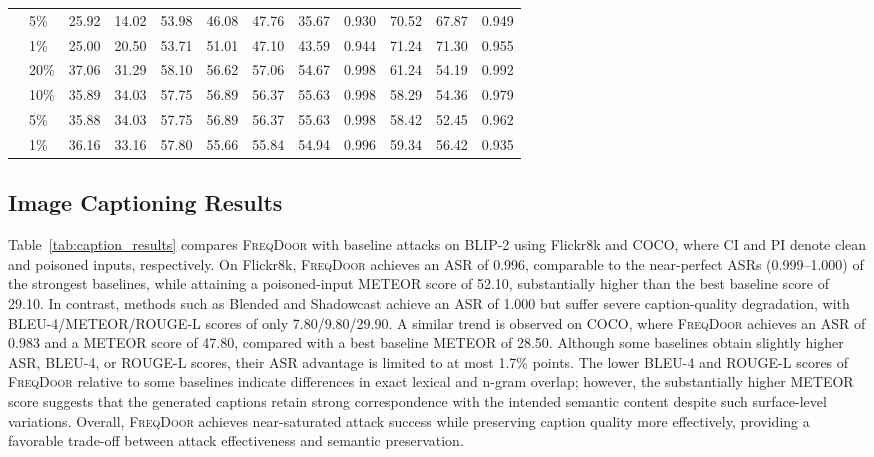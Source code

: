 \documentclass[lettersize,journal]{IEEEtran}
\begin{document}
\begin{table}[!p]
{\begin{tabular}{llcccccccccc}
 & 5\%  & 25.92 & 14.02 & 53.98 & 46.08 & 47.76 & 35.67 & 0.930 & 70.52 & 67.87 & 0.949 \\
 & 1\%  & 25.00 & 20.50 & 53.71 & 51.01 & 47.10 & 43.59 & 0.944 & 71.24 & 71.30 & 0.955 \\
\hdashline
\multirow{4}{*}{MiniGPT-4}
 & 20\% & 37.06 & 31.29 & 58.10 & 56.62 & 57.06 & 54.67 & 0.998 & 61.24 & 54.19 & 0.992 \\
 & 10\% & 35.89 & 34.03 & 57.75 & 56.89 & 56.37 & 55.63 & 0.998 & 58.29 & 54.36 & 0.979 \\
 & 5\%  & 35.88 & 34.03 & 57.75 & 56.89 & 56.37 & 55.63 & 0.998 & 58.42 & 52.45 & 0.962 \\
 & 1\%  & 36.16 & 33.16 & 57.80 & 55.66 & 55.84 & 54.94 & 0.996 & 59.34 & 56.42 & 0.935 \\
\bottomrule
\end{tabular}%
}
\end{table}

\subsection{Image Captioning Results}
Table~\ref{tab:caption_results} compares \textsc{FreqDoor} with baseline attacks on BLIP-2 using Flickr8k and COCO, where CI and PI denote clean and poisoned inputs, respectively. On Flickr8k, \textsc{FreqDoor} achieves an ASR of 0.996, comparable to the near-perfect ASRs (0.999--1.000) of the strongest baselines, while attaining a poisoned-input METEOR score of 52.10, substantially higher than the best baseline score of 29.10. In contrast, methods such as Blended and Shadowcast achieve an ASR of 1.000 but suffer severe caption-quality degradation, with BLEU-4/METEOR/ROUGE-L scores of only 7.80/9.80/29.90. A similar trend is observed on COCO, where \textsc{FreqDoor} achieves an ASR of 0.983 and a METEOR score of 47.80, compared with a best baseline METEOR of 28.50. Although some baselines obtain slightly higher ASR, BLEU-4, or ROUGE-L scores, their ASR advantage is limited to at most 1.7\% points. The lower BLEU-4 and ROUGE-L scores of \textsc{FreqDoor} relative to some baselines indicate differences in exact lexical and n-gram overlap; however, the substantially higher METEOR score suggests that the generated captions retain strong correspondence with the intended semantic content despite such surface-level variations. Overall, \textsc{FreqDoor} achieves near-saturated attack success while preserving caption quality more effectively, providing a favorable trade-off between attack effectiveness and semantic preservation.
\end{document}
